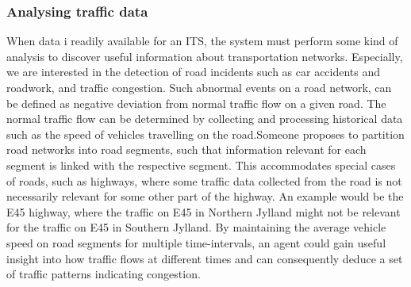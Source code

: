 \subsubsection*{Analysing traffic data}
When data i readily available for an ITS, the system must perform some kind of analysis to discover useful information about transportation networks. Especially, we are interested in the detection of road incidents such as car accidents and roadwork, and traffic congestion. Such abnormal events on a road network, can be defined as negative deviation from normal traffic flow on a given road. The normal traffic flow can be determined by collecting and processing historical data such as the speed of vehicles travelling on the road.Someone proposes to partition road networks into road segments, such that information relevant for each segment is linked with the respective segment. This accommodates special cases of roads, such as highways, where some traffic data collected from the road is not necessarily relevant for some other part of the highway. An example would be the E45 highway, where the traffic on E45 in Northern Jylland might not be relevant for the traffic on E45 in Southern Jylland. By maintaining the average vehicle speed on road segments for multiple time-intervals, an agent could gain useful insight into how traffic flows at different times and can consequently deduce a set of traffic patterns indicating congestion.